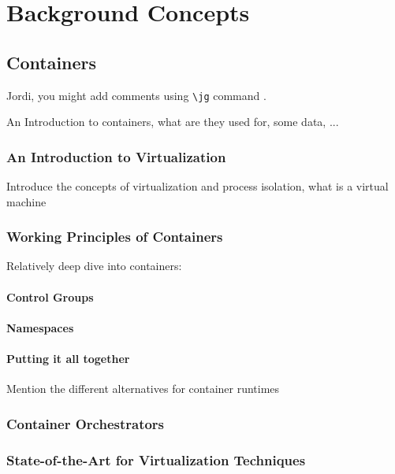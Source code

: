 \chapter{Background Concepts} \label{chap:background}

\section{Containers} \label{sec:containers}

Jordi, you might add comments using \texttt{\textbackslash jg} command .

An Introduction to containers, what are they used for, some data, ...

\subsection{An Introduction to Virtualization}

Introduce the concepts of virtualization and process isolation, what is a virtual machine

\subsection{Working Principles of Containers}

Relatively deep dive into containers:

\subsubsection*{Control Groups}

\subsubsection*{Namespaces}

\subsubsection*{Putting it all together}

Mention the different alternatives for container runtimes

\subsection{Container Orchestrators}

\subsection{State-of-the-Art for Virtualization Techniques}

